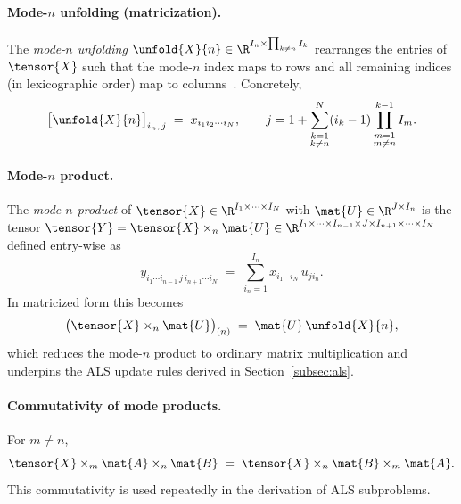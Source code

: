 \paragraph{Mode-$n$ unfolding (matricization).}
The \emph{mode-$n$ unfolding}
$\unfold{X}{n} \in \R^{I_n \times \prod_{k \neq n} I_k}$
rearranges the entries of $\tensor{X}$ such that the mode-$n$ index
maps to rows and all remaining indices (in lexicographic order) map to
columns~\cite{kolda2009tensor}.
Concretely,
\begin{equation}
  \bigl[\unfold{X}{n}\bigr]_{i_n,\, j}
  \;=\; x_{i_1 i_2 \cdots i_N},
  \qquad
  j = 1 + \sum_{\substack{k=1\\k\neq n}}^{N}
          (i_k - 1)\prod_{\substack{m=1\\m\neq n}}^{k-1} I_m.
  \label{eq:unfolding}
\end{equation}

\paragraph{Mode-$n$ product.}
The \emph{mode-$n$ product} of
$\tensor{X} \in \R^{I_1 \times \cdots \times I_N}$
with $\mat{U} \in \R^{J \times I_n}$ is the tensor
$\tensor{Y} = \tensor{X} \times_n \mat{U}
\in \R^{I_1 \times \cdots \times I_{n-1} \times J \times I_{n+1}
\times \cdots \times I_N}$ defined entry-wise as
\begin{equation}
  y_{i_1 \cdots i_{n-1}\, j\, i_{n+1} \cdots i_N}
  \;=\; \sum_{i_n=1}^{I_n} x_{i_1 \cdots i_N}\, u_{j i_n}.
  \label{eq:mode_product}
\end{equation}
In matricized form this becomes
\begin{equation}
  \bigl(\tensor{X} \times_n \mat{U}\bigr)_{(n)}
  \;=\; \mat{U}\, \unfold{X}{n},
  \label{eq:mode_product_mat}
\end{equation}
which reduces the mode-$n$ product to ordinary matrix multiplication and
underpins the ALS update rules derived in
Section~\ref{subsec:als}.

\paragraph{Commutativity of mode products.}
For $m \neq n$,
\begin{equation}
  \tensor{X} \times_m \mat{A} \times_n \mat{B}
  \;=\; \tensor{X} \times_n \mat{B} \times_m \mat{A}.
  \label{eq:mode_commute}
\end{equation}
This commutativity is used repeatedly in the derivation of ALS subproblems.

